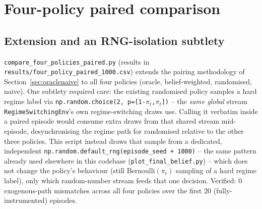 \documentclass[11pt]{article}
\begin{document}
\section{Four-policy paired comparison}
\label{sec:fourpolicy}

\subsection{Extension and an RNG-isolation subtlety}
\texttt{compare\_four\_policies\_paired.py} (results in \texttt{results/four\_policy\_paired\_1000.csv}) extends the pairing methodology of Section~\ref{sec:oraclenaive} to all four policies (oracle, belief-weighted, randomised, naive). One subtlety required care: the existing randomised policy samples a hard regime label via \texttt{np.random.choice(2, p=[1-$\pi_t$,$\pi_t$])} -- the \emph{same global} stream \texttt{RegimeSwitchingEnv}'s own regime-switching draws use. Calling it verbatim inside a paired episode would consume extra draws from that shared stream mid-episode, desynchronising the regime path for randomised relative to the other three policies. This script instead draws that sample from a dedicated, independent \texttt{np.random.default\_rng(episode\_seed + 1000)} -- the same pattern already used elsewhere in this codebase (\texttt{plot\_final\_belief.py}) -- which does not change the policy's behaviour (still $\text{Bernoulli}(\pi_t)$ sampling of a hard regime label), only which random-number stream feeds that one decision. Verified: $0$ exogenous-path mismatches across all four policies over the first $20$ (fully-instrumented) episodes.
\end{document}
